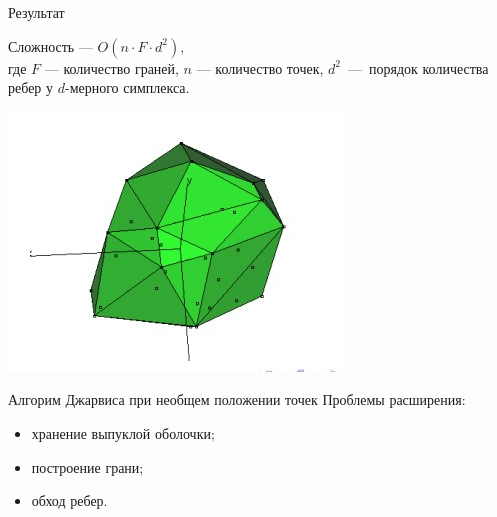 \documentclass{beamer}
\begin{document}
\begin{frame}{Результат}

    Сложность --- $O(n\cdot F\cdot d^2)$,\\
    где $F$ --- количество граней, $n$ --- количество точек, $d^2$~---~порядок количества ребер у $d$-мерного симплекса.
    \vfill
    \begin{center}
        \includegraphics[width=0.6\linewidth]{simplex.jpg}%
    \end{center}


\end{frame}
\begin{frame}{Алгорим Джарвиса при необщем положении точек}
    Проблемы расширения:
       \begin{itemize}
        \item  хранение выпуклой оболочки;
        \item  построение грани;
        \item  обход ребер.
        \end{itemize}
\end{frame}
\end{document}
